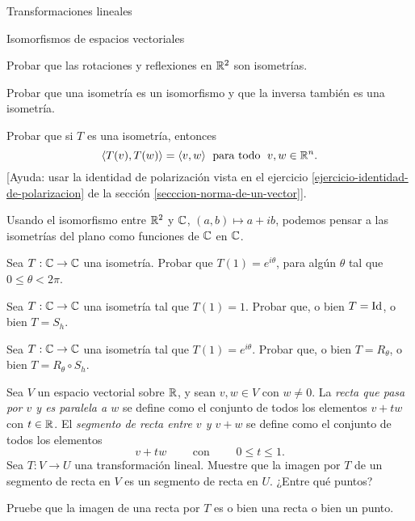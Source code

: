 \begin{chapter}{Transformaciones lineales}
\begin{section}{Isomorfismos de espacios vectoriales}
\begin{enumex}
            \begin{enumex}
                \item Probar que las rotaciones y reflexiones en $\mathbb R^2$ son isometrías. 
                \item Probar que una isometría es un isomorfismo y  que la inversa también es una isometría.
                \item Probar que si $T$ es una isometría,  entonces
                $$
                \langle T(v), T(w) \rangle = \langle v,w \rangle \; \text{ para todo } \; v,w \in \mathbb R^n.  
                $$
                [Ayuda: usar la identidad de polarización  vista en el ejercicio \ref{ejercicio-identidad-de-polarizacion} de la sección \ref{secccion-norma-de-un-vector}].
            \end{enumex}
            
            \item Usando el isomorfismo entre $\mathbb R^2$ y $\mathbb C$, $(a,b)\mapsto a + ib$,  podemos pensar a las isometrías del plano como funciones de $\mathbb C$ en $\mathbb C$.
            \begin{enumex}
                \item Sea $T: \mathbb C \to \mathbb C$ una isometría. Probar que $T(1) =e^{i\theta}$, para algún $\theta$ tal que $0 \le \theta < 2\pi$. 
                \item Sea $T: \mathbb C \to \mathbb C$ una isometría tal que $T(1) =1$. Probar que, o bien $T = \operatorname{Id}$, o  bien $T = S_h$.
                \item  Sea $T: \mathbb C \to \mathbb C$ una isometría tal que $T(1) = e^{i\theta}$. Probar que, o bien $T = R_\theta$, o  bien $T = R_\theta \circ S_h$.
            \end{enumex}
            \item Sea $V$ un espacio vectorial sobre $\mathbb R$, y sean $v, w \in V$ con $w \ne 0$. La \textit{recta que pasa por $v$ y es paralela a $w$} se define como el conjunto de todos los elementos $v + tw$ con $t\in \mathbb R$.
            El \textit{segmento de recta entre $v$ y $v + w$} se define como el conjunto de todos los elementos
            $$
            v + tw \qquad  \text{ con } \qquad  0\le t \le 1. 
            $$
            Sea $T: V \to U$ una transformación lineal. Muestre que la imagen por $T$  de un segmento de recta en $V$ es un segmento de recta en $U$. ¿Entre qué puntos?
            
            Pruebe que la imagen de una recta por $T$  es o bien una recta  o bien un punto.
            

\end{enumex}
\end{section}
\end{chapter}
